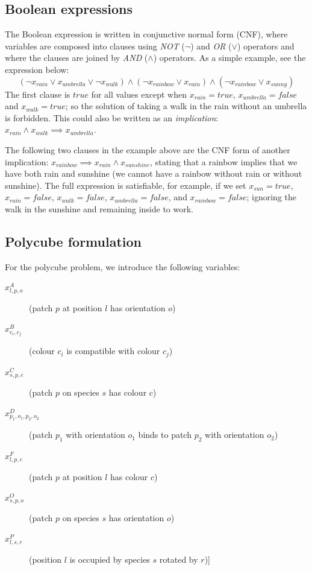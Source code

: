 \subsection{Boolean expressions}

The Boolean expression is written in conjunctive normal form (CNF), where variables are composed into clauses using \emph{NOT} (\(\lnot\)) and \emph{OR} (\(\lor\)) operators and where the clauses are joined by \emph{AND} (\(\land\)) operators. As a simple example, see the expression below:
\[
    (\lnot x_{rain} \lor x_{umbrella} \lor  \lnot x_{walk}) \land
    (\lnot x_{rainbow} \lor x_{rain}) \land
    (\lnot x_{rainbow} \lor x_{sunny})
\]
The first clause is \({true}\) for all values except when \(x_{rain}={true}\), \(x_{umbrella}={false}\) and \(x_{walk}=true\); so the solution of taking a walk in the rain without an umbrella is forbidden. This could also be written as an \emph{implication}: \(x_{rain} \land x_{walk} \implies x_{umbrella}\).

The following two clauses in the example above are the CNF form of another implication: \(x_{rainbow} \implies  x_{rain} \land x_{sunshine}\), stating that a rainbow implies that we have both rain and sunshine (we cannot have a rainbow without rain or without sunshine). The full expression is satisfiable, for example, if we set \(x_{sun}=true\), \(x_{rain}=false\), \(x_{walk}=false\), \(x_{umbrella}=false\), and \(x_{rainbow}=false\); ignoring the walk in the sunshine and remaining inside to work.

\subsection{Polycube formulation}

For the polycube problem, we introduce the following variables:
\begin{description}
    \item[\(x_{l,p,o}^{A}\)] (patch \(p\) at position \(l\) has orientation \(o\))
    \item[\(x_{c_i,c_j}^{B}\)] (colour \(c_i\) is compatible with colour \(c_j\))
    \item[\(x_{s,p,c}^{C}\)] (patch \(p\) on species \(s\) has colour \(c\))
    \item[\(x_{p_1,o_1,p_2,o_2}^{D}\)] (patch \(p_1\) with orientation \(o_1\) binds to patch \(p_2\) with orientation \(o_2\))
    \item[\(x_{l,p,c}^{F}\)] (patch \(p\) at position \(l\) has colour \(c\))
    \item[\(x_{s,p,o}^{O}\)] (patch \(p\) on species \(s\) has orientation \(o\))
    \item[\(x_{l,s,r}^{P}\)] (position \(l\) is occupied by species \(s\) rotated by \(r\))] 
\end{description}

